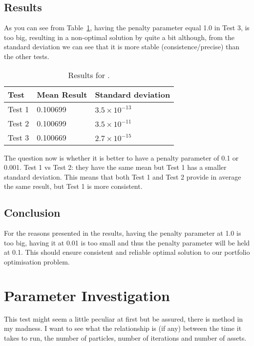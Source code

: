     \subsection{Results}
    As you can see from Table~\ref{table:penalty_results}, having the penalty parameter equal 1.0 in Test 3, is too big, resulting in a non-optimal solution by quite a bit although, from the standard deviation we can see that it is more stable (consistence/precise) than the other tests.
        \begin{table}[H]
          \setlength{\extrarowheight}{2.0pt}
          \begin{tabular}{|l|l|l|}
            \hline
            Test & Mean Result & Standard deviation \\
            \hline
            Test 1 & 0.100699 & $3.5\times10^{-13}$ \\
            \hline
            Test 2 & 0.100699 & $3.5\times10^{-11}$ \\
            \hline
            Test 3 & 0.100669 & $2.7\times10^{-15}$ \\
            \hline
          \end{tabular}
          \caption{Results for .}
          \label{table:penalty_results}
        \end{table}

      The question now is whether it is better to have a penalty parameter of 0.1 or 0.001. Test 1 vs Test 2: they have the same mean but Test 1 has a smaller standard deviation. This means that both Test 1 and Test 2 provide in average the same result, but Test 1 is more consistent.

    \subsection{Conclusion}
      For the reasons presented in the results, having the penalty parameter at 1.0 is too big, having it at 0.01 is too small and thus the penalty parameter will be held at 0.1. This should ensure consistent and reliable optimal solution to our portfolio optimisation problem.

  \section{Parameter Investigation} %
  \label{sec:relationships}
  This test might seem a little peculiar at first but be assured, there is method in my madness. I want to see what the relationship is (if any) between the time it takes to run, the number of particles, number of iterations and number of assets.

